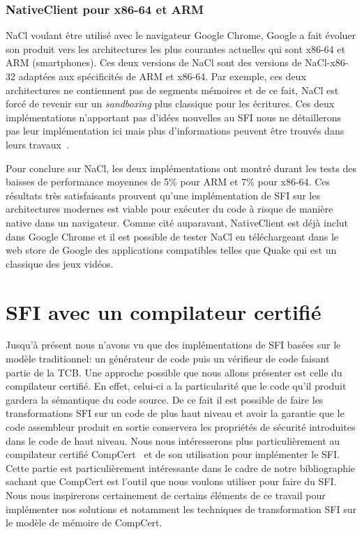 \documentclass[11pt]{sdm}
\begin{document}
\subsubsection{NativeClient pour x86-64 et ARM}
NaCl voulant être utilisé avec le navigateur Google Chrome, Google a fait évoluer son produit vers les architectures les plus courantes actuelles qui sont x86-64 et ARM (smartphones). Ces deux versions de NaCl sont des versions de NaCl-x86-32 adaptées aux spécificités de ARM et x86-64. Par exemple, ces deux architectures ne contiennent pas de segments mémoires et de ce fait, NaCl est forcé de revenir sur un \textit{sandboxing} plus classique pour les écritures.
Ces deux implémentations n'apportant pas d'idées nouvelles au SFI nous ne détaillerons pas leur implémentation ici mais plus d'informations peuvent être trouvés dans leurs travaux~\cite{Sehr:2010:ASF:1929820.1929822}.

Pour conclure sur NaCl, les deux implémentations ont montré durant les tests des baisses de performance moyennes de 5\% pour ARM et 7\% pour x86-64. Ces résultats très satisfaisants prouvent qu'une implémentation de SFI sur les architectures modernes est viable pour exécuter du code à risque de manière native dans un navigateur. Comme cité auparavant, NativeClient est déjà inclut dans Google Chrome et il est possible de tester NaCl en téléchargeant dans le web store de Google des applications compatibles telles que Quake qui est un classique des jeux vidéos.

\section{SFI avec un compilateur certifié}


Jusqu'à présent nous n'avons vu que des implémentations de SFI basées sur le modèle traditionnel: un générateur de code puis un vérifieur de code faisant partie de la TCB. Une approche possible que nous allons présenter est celle du compilateur certifié. En effet, celui-ci a la particularité que le code qu'il produit gardera la sémantique du code source. De ce fait il est possible de faire les transformations SFI sur un code de plus haut niveau et avoir la garantie que le code assembleur produit en sortie conservera les propriétés de sécurité introduites dans le code de haut niveau.
Nous nous intéresserons plus particulièrement au compilateur certifié CompCert~\cite{Leroy:2009:FVR:1538788.1538814} et de son utilisation pour implémenter le SFI.
Cette partie est particulièrement intéressante dans le cadre de notre bibliographie sachant que CompCert est l'outil que nous voulons utiliser pour faire du SFI. Nous nous inspirerons certainement de certains éléments de ce travail pour implémenter nos solutions et notamment les techniques de transformation SFI sur le modèle de mémoire de CompCert.
\end{document}
